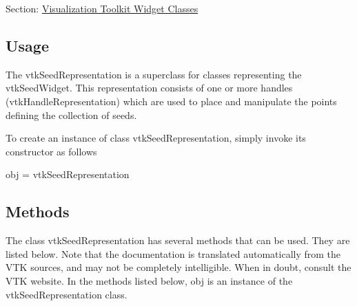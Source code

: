 Section\-: \hyperlink{sec_vtkwidgets}{Visualization Toolkit Widget Classes} \hypertarget{vtkwidgets_vtkxyplotwidget_Usage}{}\subsection{Usage}\label{vtkwidgets_vtkxyplotwidget_Usage}
The vtk\-Seed\-Representation is a superclass for classes representing the vtk\-Seed\-Widget. This representation consists of one or more handles (vtk\-Handle\-Representation) which are used to place and manipulate the points defining the collection of seeds.

To create an instance of class vtk\-Seed\-Representation, simply invoke its constructor as follows \begin{DoxyVerb}  obj = vtkSeedRepresentation
\end{DoxyVerb}
 \hypertarget{vtkwidgets_vtkxyplotwidget_Methods}{}\subsection{Methods}\label{vtkwidgets_vtkxyplotwidget_Methods}
The class vtk\-Seed\-Representation has several methods that can be used. They are listed below. Note that the documentation is translated automatically from the V\-T\-K sources, and may not be completely intelligible. When in doubt, consult the V\-T\-K website. In the methods listed below, {\ttfamily obj} is an instance of the vtk\-Seed\-Representation class. 
